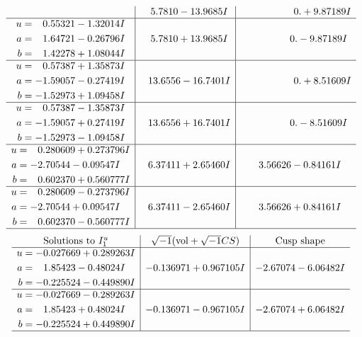 \documentclass[1p]{elsarticle_modified}
\theoremstyle{definition}
\newcommand{\I}{\sqrt{-1}}
\begin{document}
$$\begin{array}{c|c|c}
 & \phantom{-}5.7810 - 13.9685 I & \phantom{-0.000000 -}0. + 9.87189 I \\ \hline\begin{aligned}
u &= \phantom{-}0.55321 - 1.32014 I \\
a &= \phantom{-}1.64721 - 0.26796 I \\
b &= \phantom{-}1.42278 + 1.08044 I\end{aligned}
 & \phantom{-}5.7810 + 13.9685 I & \phantom{-0.000000 } 0. - 9.87189 I \\ \hline\begin{aligned}
u &= \phantom{-}0.57387 + 1.35873 I \\
a &= -1.59057 - 0.27419 I \\
b &= -1.52973 + 1.09458 I\end{aligned}
 & \phantom{-}13.6556 - 16.7401 I & \phantom{-0.000000 -}0. + 8.51609 I \\ \hline\begin{aligned}
u &= \phantom{-}0.57387 - 1.35873 I \\
a &= -1.59057 + 0.27419 I \\
b &= -1.52973 - 1.09458 I\end{aligned}
 & \phantom{-}13.6556 + 16.7401 I & \phantom{-0.000000 } 0. - 8.51609 I \\ \hline\begin{aligned}
u &= \phantom{-}0.280609 + 0.273796 I \\
a &= -2.70544 - 0.09547 I \\
b &= \phantom{-}0.602370 + 0.560777 I\end{aligned}
 & \phantom{-}6.37411 + 2.65460 I & \phantom{-}3.56626 - 0.84161 I \\ \hline\begin{aligned}
u &= \phantom{-}0.280609 - 0.273796 I \\
a &= -2.70544 + 0.09547 I \\
b &= \phantom{-}0.602370 - 0.560777 I\end{aligned}
 & \phantom{-}6.37411 - 2.65460 I & \phantom{-}3.56626 + 0.84161 I\\
 \hline 
 \end{array}$$\newpage$$\begin{array}{c|c|c}  
\text{Solutions to }I^u_{1}& \I (\text{vol} + \sqrt{-1}CS) & \text{Cusp shape}\\
 \hline 
\begin{aligned}
u &= -0.027669 + 0.289263 I \\
a &= \phantom{-}1.85423 - 0.48024 I \\
b &= -0.225524 - 0.449890 I\end{aligned}
 & -0.136971 + 0.967105 I & -2.67074 - 6.06482 I \\ \hline\begin{aligned}
u &= -0.027669 - 0.289263 I \\
a &= \phantom{-}1.85423 + 0.48024 I \\
b &= -0.225524 + 0.449890 I\end{aligned}
 & -0.136971 - 0.967105 I & -2.67074 + 6.06482 I\\
 \hline 
 \end{array}$$\newpage\newpage\renewcommand{\arraystretch}{1}
\end{document}
